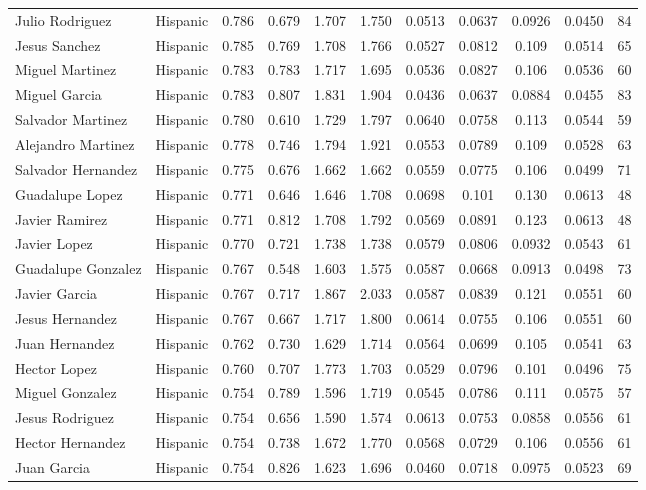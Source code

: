 \documentclass[]{article}
\begin{document}
\begin{tabular}{lcccccccccc}
Julio Rodriguez & Hispanic & 0.786 & 0.679 & 1.707 & 1.750 & 0.0513 & 0.0637 & 0.0926 & 0.0450 & 84 \\
Jesus Sanchez & Hispanic & 0.785 & 0.769 & 1.708 & 1.766 & 0.0527 & 0.0812 & 0.109 & 0.0514 & 65 \\
Miguel Martinez & Hispanic & 0.783 & 0.783 & 1.717 & 1.695 & 0.0536 & 0.0827 & 0.106 & 0.0536 & 60 \\
Miguel Garcia & Hispanic & 0.783 & 0.807 & 1.831 & 1.904 & 0.0436 & 0.0637 & 0.0884 & 0.0455 & 83 \\
Salvador Martinez & Hispanic & 0.780 & 0.610 & 1.729 & 1.797 & 0.0640 & 0.0758 & 0.113 & 0.0544 & 59 \\
Alejandro Martinez & Hispanic & 0.778 & 0.746 & 1.794 & 1.921 & 0.0553 & 0.0789 & 0.109 & 0.0528 & 63 \\
Salvador Hernandez & Hispanic & 0.775 & 0.676 & 1.662 & 1.662 & 0.0559 & 0.0775 & 0.106 & 0.0499 & 71 \\
Guadalupe Lopez & Hispanic & 0.771 & 0.646 & 1.646 & 1.708 & 0.0698 & 0.101 & 0.130 & 0.0613 & 48 \\
Javier Ramirez & Hispanic & 0.771 & 0.812 & 1.708 & 1.792 & 0.0569 & 0.0891 & 0.123 & 0.0613 & 48 \\
Javier Lopez & Hispanic & 0.770 & 0.721 & 1.738 & 1.738 & 0.0579 & 0.0806 & 0.0932 & 0.0543 & 61 \\
Guadalupe Gonzalez & Hispanic & 0.767 & 0.548 & 1.603 & 1.575 & 0.0587 & 0.0668 & 0.0913 & 0.0498 & 73 \\
Javier Garcia & Hispanic & 0.767 & 0.717 & 1.867 & 2.033 & 0.0587 & 0.0839 & 0.121 & 0.0551 & 60 \\
Jesus Hernandez & Hispanic & 0.767 & 0.667 & 1.717 & 1.800 & 0.0614 & 0.0755 & 0.106 & 0.0551 & 60 \\
Juan Hernandez & Hispanic & 0.762 & 0.730 & 1.629 & 1.714 & 0.0564 & 0.0699 & 0.105 & 0.0541 & 63 \\
Hector Lopez & Hispanic & 0.760 & 0.707 & 1.773 & 1.703 & 0.0529 & 0.0796 & 0.101 & 0.0496 & 75 \\
Miguel Gonzalez & Hispanic & 0.754 & 0.789 & 1.596 & 1.719 & 0.0545 & 0.0786 & 0.111 & 0.0575 & 57 \\
Jesus Rodriguez & Hispanic & 0.754 & 0.656 & 1.590 & 1.574 & 0.0613 & 0.0753 & 0.0858 & 0.0556 & 61 \\
Hector Hernandez & Hispanic & 0.754 & 0.738 & 1.672 & 1.770 & 0.0568 & 0.0729 & 0.106 & 0.0556 & 61 \\
Juan Garcia & Hispanic & 0.754 & 0.826 & 1.623 & 1.696 & 0.0460 & 0.0718 & 0.0975 & 0.0523 & 69 \\

\end{tabular}
\end{document}
